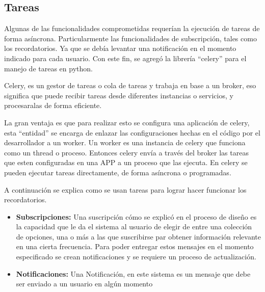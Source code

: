     \subsection{Tareas}
        \par Algunas de las funcionalidades comprometidas requerían la ejecución de tareas de forma asíncrona. Particularmente las funcionalidades de subscripción, tales como los recordatorios. Ya que se debía levantar una notificación en el momento indicado para cada usuario. Con este fin, se agregó la librería “celery” para el manejo de tareas en python.
        \par Celery, es un gestor de tareas o cola de tareas y trabaja en base a un broker, eso significa que puede recibir tareas desde diferentes instancias o servicios, y procesaralas de forma eficiente.
        \par La gran ventaja es que para realizar esto se configura una aplicación de celery, esta “entidad” se encarga de enlazar las configuraciones hechas en el código por el desarrollador a un worker. Un worker es una instancia de celery que funciona como un thread o proceso. Entonces celery envía a través del broker las tareas que esten configuradas en una APP a un proceso que las ejecuta. En celery se pueden ejecutar tareas directamente, de forma asíncrona o programadas.
        \par A continuación se explica como se usan tareas para lograr hacer funcionar los recordatorios.
        \begin{itemize}
            \item \textbf{Subscripciones:} Una suscripción cómo se explicó en el proceso de diseño es la capacidad que le da el sistema al usuario de elegir de entre una colección de opciones, una o más a las que suscribirse par obtener información relevante en una cierta frecuencia. Para poder entregar estos mensajes en el momento especificado se crean notificaciones y se requiere un proceso de actualización.
            \item \textbf{Notificaciones:} Una Notificación, en este sistema es un mensaje que debe ser enviado a un usuario en algún momento
        \end{itemize}
    
